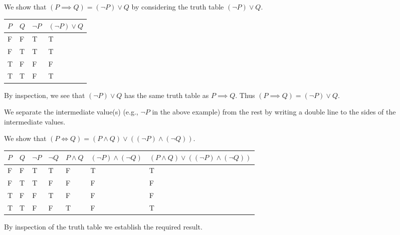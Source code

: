\begin{example}
    We show that $(P \implies Q) = (\lnot P) \lor Q$ by considering the truth table $(\lnot P) \lor Q$.
    \begin{table}[h]
        \centering
        \begin{tabular}{|l|l||l||l|}
            \hline
            $P$ & $Q$ & $\lnot P$ & $(\lnot P) \lor Q$ \\ \hline
            F   & F   & T         & T                  \\ \hline
            F   & T   & T         & T                  \\ \hline
            T   & F   & F         & F                  \\ \hline
            T   & T   & F         & T                  \\ \hline
        \end{tabular}
    \end{table}
    
    By inspection, we see that $(\lnot P) \lor Q$ has the same truth table as $P \implies Q$. Thus $(P \implies Q) = (\lnot P) \lor Q$.
\end{example}
\begin{remark}
    We separate the intermediate value(s) (e.g., $\lnot P$ in the above example) from the rest by writing a double line to the sides of the intermediate values.
\end{remark}

\begin{example}
    We show that $(P \iff Q) = (P \land Q) \lor ((\lnot P) \land (\lnot Q))$.
    \begin{table}[h]
        \centering
        \begin{tabular}{|l|l||l|l|l|l||l|}
            \hline
            $P$ & $Q$ & $\lnot P$ & $\lnot Q$ & $P \land Q$ & $(\lnot P) \land (\lnot Q)$ & $(P \land Q) \lor ((\lnot P) \land (\lnot Q))$ \\ \hline
            F   & F   & T         & T         & F           & T                           & T                                              \\ \hline
            F   & T   & T         & F         & F           & F                           & F                                              \\ \hline
            T   & F   & F         & T         & F           & F                           & F                                              \\ \hline
            T   & T   & F         & F         & T           & F                           & T                                              \\ \hline
        \end{tabular}
    \end{table}

    By inspection of the truth table we establish the required result.
\end{example}

